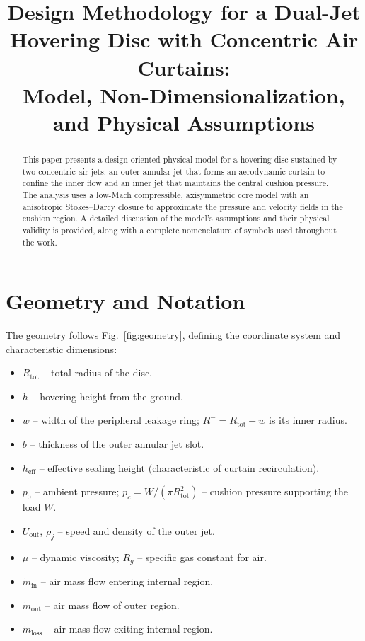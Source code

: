 \documentclass[11pt,a4paper]{article}
\title{Design Methodology for a Dual-Jet Hovering Disc with Concentric Air Curtains:\\
Model, Non-Dimensionalization, and Physical Assumptions}
\author{ }
\date{ }
\begin{document}
\maketitle

\begin{abstract}
This paper presents a design-oriented physical model for a hovering disc sustained by two concentric air jets: 
an outer annular jet that forms an aerodynamic curtain to confine the inner flow and an inner jet that maintains the central cushion pressure.
The analysis uses a low-Mach compressible, axisymmetric core model with an anisotropic Stokes--Darcy closure to approximate the pressure and velocity fields in the cushion region.
A detailed discussion of the model's assumptions and their physical validity is provided, along with a complete nomenclature of symbols used throughout the work.
\end{abstract}

\section{Geometry and Notation}
The geometry follows Fig.~\ref{fig:geometry}, defining the coordinate system and characteristic dimensions:
\begin{itemize}
  \item $R_{\mathrm{tot}}$ -- total radius of the disc.
  \item $h$ -- hovering height from the ground.
  \item $w$ -- width of the peripheral leakage ring; $R^{-}=R_{\mathrm{tot}}-w$ is its inner radius.
  \item $b$ -- thickness of the outer annular jet slot.
  \item $h_{\mathrm{eff}}$ -- effective sealing height (characteristic of curtain recirculation).
  \item $p_0$ -- ambient pressure; $p_c=W/(\pi R_{\mathrm{tot}}^2)$ -- cushion pressure supporting the load $W$.
  \item $U_{\mathrm{out}}$, $\rho_j$ -- speed and density of the outer jet.
  \item $\mu$ -- dynamic viscosity; $R_g$ -- specific gas constant for air.
  \item $\dot{m}_{\mathrm{in}}$ -- air mass flow entering internal region.
  \item $\dot{m}_{\mathrm{out}}$ -- air mass flow of outer region.
  \item $\dot{m}_{\mathrm{loss}}$ -- air mass flow exiting internal region.
\end{itemize}
\end{document}

